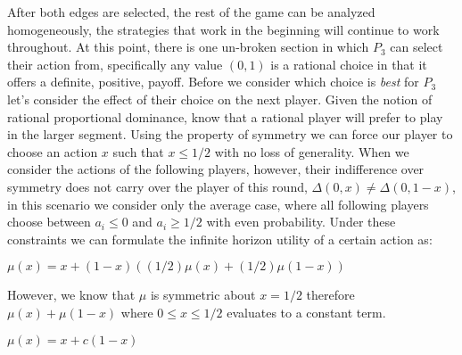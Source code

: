 \documentclass{acm_proc_article-sp}
\begin{document}
After both edges are selected, the rest of the game can be analyzed homogeneously, the strategies that work in the beginning will continue to work throughout. At this point, there is one un-broken section in which $P_3$ can select their action from, specifically any value $(0, 1)$ is a rational choice in that it offers a definite, positive, payoff\cite{perea2012epistemic}. Before we consider which choice is \textit{best} for $P_3$ let's consider the effect of their choice on the next player. Given the notion of rational proportional dominance, know that a rational player will prefer to play in the larger segment. Using the property of symmetry we can force our player to choose an action $x$ such that $x \leq 1/2$ with no loss of generality. When we consider the actions of the following players, however, their indifference over symmetry does not carry over the player of this round, $\Delta(0, x) \neq \Delta(0, 1-x)$, in this scenario we consider only the average case, where all following players choose between $a_i \leq 0$ and $a_i \geq 1/2$ with even probability. Under these constraints we can formulate the infinite horizon utility of a certain action as:

$\mu(x) = x + (1 - x)((1/2)\mu(x) + (1/2)\mu(1-x))$



However, we know that $\mu$ is symmetric about $x = 1/2$ therefore $\mu(x) + \mu(1-x)$ where $0 \leq x \leq 1/2$ evaluates to a constant term.

$\mu(x) = x + c(1 - x)$




\end{document}
